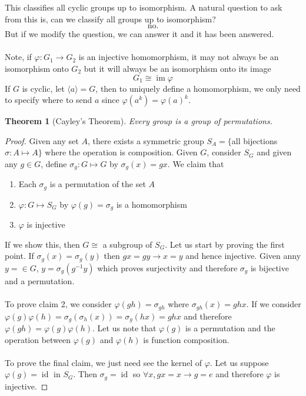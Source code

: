 \documentclass{article}
\DeclareMathOperator{\im}{im}
\DeclareMathOperator{\id}{id}
\newtheorem{theorem}{Theorem}[section]
\theoremstyle{definition}
\begin{document}
This classifies all cyclic groups up to isomorphism. A natural question to ask from this is, can we classify all groups up to isomorphism? 
\begin{equation*}
    \text{no.}
\end{equation*}
But if we modify the question, we can answer it and it has been answered. \\\\
Note, if $\varphi : G_1 \to G_2$ is an injective homomorphism, it may not always be an isomorphism onto $G_2$ but it will always be an isomorphism onto its image 
\begin{equation*}
    G_1 \cong \im \varphi
\end{equation*}
If $G$ is cyclic, let $\langle a \rangle =G$, then to uniquely define a homomorphism, we only need to specify where to send $a$ since $\varphi (a^k) =\varphi (a)^k$. 
\begin{theorem}[Cayley's Theorem]
    Every group is a group of permutations.
\end{theorem}
\begin{proof}
    Given any set $A$, there exists a symmetric group $S_A=\{$all bijections $\sigma: A\mapsto A\}$ where the operation is composition. Given $G$, consider $S_G$ and given any $g \in G$, define $\sigma_g:G\mapsto G$ by $\sigma_g(x)=gx$. We claim that 
    \begin{enumerate}
        \item Each $\sigma_g$ is a permutation of the set $A$ 
        \item $\varphi:G\mapsto S_G$ by $\varphi (g)=\sigma_g$ is a homomorphism
        \item $\varphi$ is injective
    \end{enumerate}
    If we show this, then $G \cong $ a subgroup of $S_G$. Let us start by proving the first point. If $\sigma_g(x)=\sigma_g(y)$ then $gx=gy \rightarrow x=y$ and hence injective. Given anny $y=\in G$, $y=\sigma_g(g^{-1}y)$ which proves surjectivity and therefore $\sigma_g$ is bijective and a permutation. \\\\
    To prove claim 2, we consider $\varphi (gh) =\sigma_{gh}$ where $\sigma_{gh}(x)=ghx$. If we consider $\varphi(g) \varphi(h) = \sigma_g(\sigma_h(x)) = \sigma_g(hx)=ghx$ and therefore $\varphi(gh)=\varphi(g)\varphi(h)$. Let us note that $\varphi(g)$ is a permutation and the operation between $\varphi(g) $ and $\varphi(h)$ is function composition. \\\\
    To prove the final claim, we just need see the kernel of $\varphi$. Let us suppose $\varphi(g)=\id$ in $S_G$. Then $\sigma_g =\id $ so $\forall x, gx=x \to g=e$ and therefore $\varphi$ is injective.
\end{proof}
\end{document}
